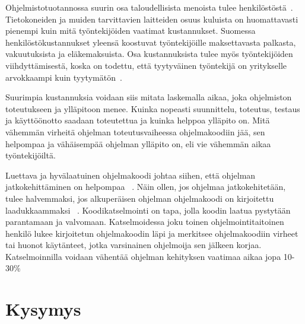 \documentclass[finnish]{tktltiki2}
\theoremstyle{definition}
\theoremstyle{remark}
\begin{document}
Ohjelmistotuotannossa suurin osa taloudellisista menoista tulee henkilöstöstä~\cite{haikala1995ohjelmistotuotanto}. Tietokoneiden ja muiden tarvittavien laitteiden osuus kuluista on huomattavasti pienempi kuin mitä työntekijöiden vaatimat kustannukset. Suomessa henkilöstökustannukset yleensä koostuvat työntekijöille maksettavasta palkasta, vakuutuksista ja eläkemaksuista. Osa kustannuksista tulee myös työntekijöiden viihdyttämisestä, koska on todettu, että tyytyväinen työntekijä on yritykselle arvokkaampi kuin tyytymätön~\cite{airo2008oma}.

Suurimpia kustannuksia voidaan siis mitata laskemalla aikaa, joka ohjelmiston toteutukseen ja ylläpitoon menee. Kuinka nopeasti suunnittelu, toteutus, testaus ja käyttöönotto saadaan toteutettua ja kuinka helppoa ylläpito on.  Mitä vähemmän virheitä ohjelman toteutusvaiheessa ohjelmakoodiin jää, sen helpompaa ja vähäisempää ohjelman ylläpito on, eli vie vähemmän aikaa työntekijöiltä.

Luettava ja hyvälaatuinen ohjelmakoodi johtaa siihen, että ohjelman jatkokehittäminen on helpompaa ~\cite{johnson1994instrumented}. Näin ollen, jos ohjelmaa jatkokehitetään, tulee halvemmaksi, jos alkuperäisen ohjelman ohjelmakoodi on kirjoitettu laadukkaammaksi ~\cite{fagan2001design}. Koodikatselmointi on tapa, jolla koodin laatua pystytään parantamaan ja valvomaan. Katselmoidessa joku toinen ohjelmointitaitoinen henkilö lukee kirjoitetun ohjelmakoodin läpi ja merkitsee ohjelmakoodiin virheet tai huonot käytänteet, jotka varsinainen ohjelmoija sen jälkeen korjaa. Katselmoinnilla voidaan vähentää ohjelman kehityksen vaatimaa aikaa jopa 10-30\%~\cite{gilb1993software}


\section{Kysymys}
\end{document}
